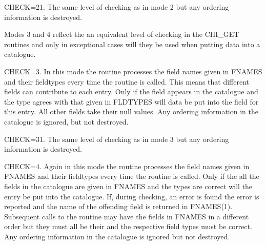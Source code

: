 \documentclass[11pt,nolof]{starlink}
\begin{document}
\begin{small}
{{      CHECK=21. The same level of checking as in mode 2 but any ordering
      information is destroyed.

      Modes 3 and 4 reflect the an equivalent level of checking in the
      CHI\_GET routines and only in exceptional cases will they be used
      when putting data into a catalogue.

      CHECK=3. In this mode the routine processes the field names given in
      FNAMES and their fieldtypes every time the routine is called. This means
      that different fields can contribute to each entry. Only if the field
      appears in the catalogue and
      the type agrees with that given in FLDTYPES will data be put into
      the field for this entry. All other fields take their null values.
      Any ordering information in the catalogue
      is ignored, but not destroyed.

      CHECK=31. The same level of checking as in mode 3 but any ordering
      information is destroyed.

      CHECK=4. Again in this mode the routine processes the field names given
      in FNAMES and their fieldtypes every time the routine is called.  Only
      if the all the fields in the catalogue are given in FNAMES and the
      types are correct will the entry be put into the catalogue.  If, during
      checking, an error is found the error is reported and the name of the
      offending field is returned in FNAMES(1). Subsequent
      calls to the routine may have the fields in FNAMES in a different order
      but they must all be their and the respective field types must be correct.
      Any ordering information in the catalogue is ignored but not destroyed.

}}
\end{small}
\end{document}
